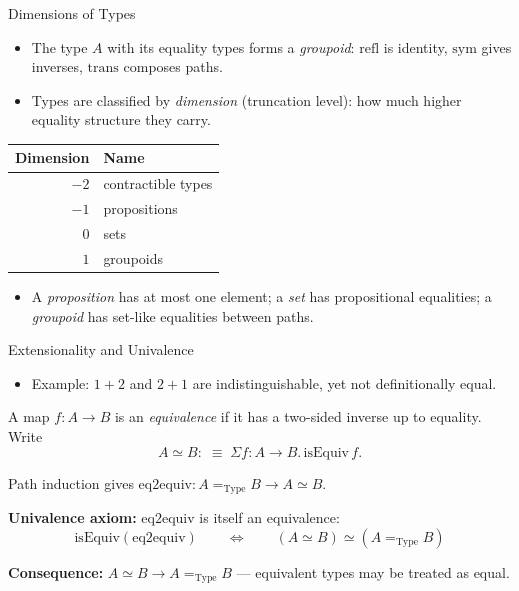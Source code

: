\documentclass[aspectratio=169,11pt]{beamer}
\begin{document}
\begin{frame}{Dimensions of Types}
  \small
  \begin{itemize}
    \item The type \(A\) with its equality types forms a \textit{groupoid}: \(\mathrm{refl}\) is identity, \(\mathrm{sym}\) gives inverses, \(\mathrm{trans}\) composes paths.
    \item Types are classified by \textit{dimension} (truncation level): how much higher equality structure they carry.
  \end{itemize}

  \vspace{0.4em}
  \centering
  \begin{tabular}{@{}r@{\quad}l@{}}
    \textbf{Dimension} & \textbf{Name} \\[0.2em]
    \hline
    $-2$ & contractible types \\
    $-1$ & propositions \\
    $0$  & sets \\
    $1$  & groupoids \\
  \end{tabular}

  \vspace{0.4em}
  \begin{itemize}
    \item A \textit{proposition} has at most one element; a \textit{set} has propositional equalities; a \textit{groupoid} has set-like equalities between paths.
  \end{itemize}
\end{frame}

\begin{frame}{Extensionality and Univalence}
  \small
  \begin{itemize}
    \item Example: \(1 + 2\) and \(2 + 1\) are indistinguishable, yet not definitionally equal.
  \end{itemize}

  \vspace{0.3em}
  A map \(f : A \to B\) is an \textit{equivalence} if it has a two-sided inverse up to equality.
  Write
  \[
    A \simeq B :\;\equiv\; \Sigma f : A \to B.\,\mathrm{isEquiv}\,f.
  \]

  \vspace{0.2em}
  Path induction gives \(\mathrm{eq2equiv} : A =_{\mathrm{Type}} B \to A \simeq B\).

  \vspace{0.3em}
  \textbf{Univalence axiom:}\; \(\mathrm{eq2equiv}\) is itself an equivalence:
  \[
    \mathrm{isEquiv}(\mathrm{eq2equiv})
    \qquad\Longleftrightarrow\qquad
    (A \simeq B) \simeq (A =_{\mathrm{Type}} B)
  \]

  \vspace{0.2em}
  \textbf{Consequence:}\; \(A \simeq B \to A =_{\mathrm{Type}} B\) --- equivalent types may be treated as equal.
\end{frame}
\end{document}
